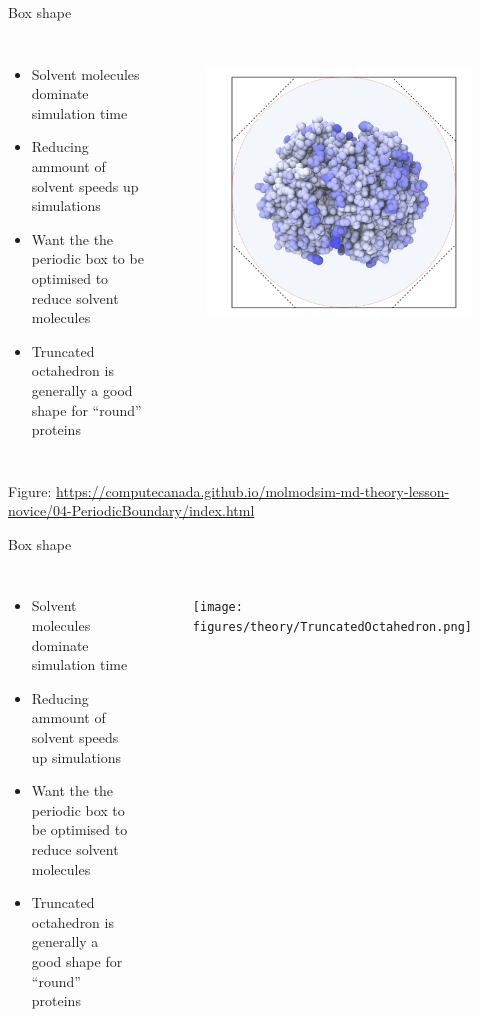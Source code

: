 \begin{frame}{Box shape}
\begin{columns}
\begin{itemize}
	\item Solvent molecules dominate simulation time
	\item Reducing ammount of solvent speeds up simulations
	\item Want the the periodic box to be optimised to reduce solvent molecules
	\item Truncated octahedron is generally a good shape for \enquote{round} proteins
\end{itemize}
\begin{figure}
\includegraphics[height=0.7\textwidth]{figures/theory/cubic_box.png}
\end{figure}
\end{columns}
{\tiny Figure: \href{https://computecanada.github.io/molmodsim-md-theory-lesson-novice/04-Periodic_Boundary/index.html}{https://computecanada.github.io/molmodsim-md-theory-lesson-novice/04-Periodic\textunderscore Boundary/index.html}}
\end{frame}
\begin{frame}{Box shape}
\begin{columns}
\begin{itemize}
	\item Solvent molecules dominate simulation time
	\item Reducing ammount of solvent speeds up simulations
	\item Want the the periodic box to be optimised to reduce solvent molecules
	\item Truncated octahedron is generally a good shape for \enquote{round} proteins
\end{itemize}
\begin{figure}
\texttt{[image: figures/theory/TruncatedOctahedron.png]}
\end{figure}
\end{columns}

\end{frame}


